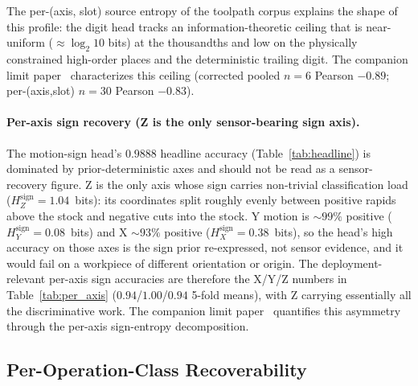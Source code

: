 \documentclass[sensors,article,submit,moreauthors,pdftex]{Definitions/mdpi}
\begin{document}
The per-(axis, slot) source entropy of the toolpath corpus explains the shape of this profile: the digit head tracks an information-theoretic ceiling that is near-uniform ($\approx\!\log_2 10$ bits) at the thousandths and low on the physically constrained high-order places and the deterministic trailing digit. The companion limit paper~\cite{paperB_entropy} characterizes this ceiling (corrected pooled $n\!=\!6$ Pearson $-0.89$; per-(axis,slot) $n\!=\!30$ Pearson $-0.83$).

\paragraph{Per-axis sign recovery (Z is the only sensor-bearing sign axis).} The motion-sign head's $0.9888$ headline accuracy (Table~\ref{tab:headline}) is dominated by prior-deterministic axes and should not be read as a sensor-recovery figure. Z is the only axis whose sign carries non-trivial classification load ($H_{Z}^{\text{sign}}\!=\!1.04$~bits): its coordinates split roughly evenly between positive rapids above the stock and negative cuts into the stock. Y motion is $\sim\!99\%$ positive ($H_{Y}^{\text{sign}}\!=\!0.08$~bits) and X $\sim\!93\%$ positive ($H_{X}^{\text{sign}}\!=\!0.38$~bits), so the head's high accuracy on those axes is the sign prior re-expressed, not sensor evidence, and it would fail on a workpiece of different orientation or origin. The deployment-relevant per-axis sign accuracies are therefore the X/Y/Z numbers in Table~\ref{tab:per_axis} ($0.94$/$1.00$/$0.94$ 5-fold means), with Z carrying essentially all the discriminative work. The companion limit paper~\cite{paperB_entropy} quantifies this asymmetry through the per-axis sign-entropy decomposition.

\subsection{Per-Operation-Class Recoverability}
\label{sec:per-op-class}
\end{document}
